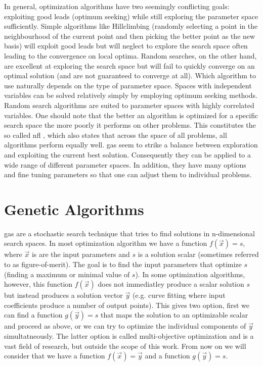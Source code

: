 In general, optimization algorithms have two seemingly conflicting goals: exploiting good leads (optimum seeking) while still exploring the parameter space sufficiently. Simple algorithms like Hillclimbing (randomly selecting a point in the neighbourhood of the current point and then picking the better point as the new basis) will exploit good leads but will neglect to explore the search space often leading to the convergence on local optima. Random searches, on the other hand, are excellent at exploring the search space but will fail to quickly converge on an optimal solution (and are not guaranteed to converge at all). Which algorithm to use naturally depends on the type of parameter space. Spaces with independent variables can be solved relatively simply by employing optimum seeking methods. Random search algorithms are suited to parameter spaces with highly correlated variables. One should note that the better an algorithm is optimized for a specific search space the more poorly it performs on other problems. This constitutes the so called  \gls{nfl} , which also states that across the space of all problems, all algorithms perform equally well. \glspl{ga} seem to strike a balance between exploration and exploiting the current best solution. Consequently they can be applied to a wide range of different parameter spaces. In addition, they have many options and fine tuning parameters so that one can adjust them to individual problems. 

\section{Genetic Algorithms}
\glspl{ga} are a stochastic search technique that tries to find solutions in n-dimensional search spaces. In most optimization algorithm we have a function $f(\vec{x})=s$, where $\vec{x}$ is are the input parameters and $s$ is a solution scalar (sometimes referred to as figure-of-merit). The goal is to find the input parameters that optimize $s$ (finding a maximum or minimal value of $s$). In some optimization algorithms, however,  this function $f(\vec{x})$ does not immediatley produce a scalar solution $s$ but instead produces a solution vector $\vec{y}$ (e.g. curve fitting where input coefficients produce a number of output points). This gives two option, first we can find a function $g(\vec{y})=s$ that maps the solution to an optimizable scalar and proceed as above, or we can try to optimize the individual components of $\vec{y}$ simultatneously. The latter option is called multi-objective optimization and is a vast field of research, but outside the scope of this work. From now on we will consider that we have a function $f(\vec{x})=\vec{y}$ and a function $g(\vec{y})=s$. 

